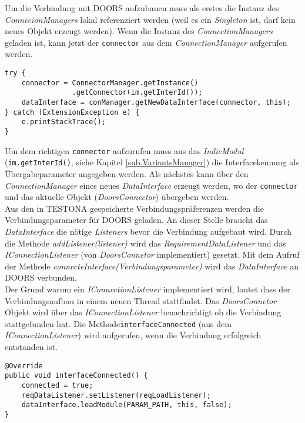 Um die Verbindung mit DOORS aufzubauen muss als erstes die Instanz des \textit{ConnecionManagers} lokal referenziert werden (weil es ein \textit{Singleton} ist, darf kein neues Objekt erzeugt werden). Wenn die Instanz des \textit{ConnectionManagers} geladen ist, kann jetzt der \texttt{connector} aus dem \textit{ConnectionManager} aufgerufen werden.

\begin{lstlisting}[caption={Verbindungsaufbau}, captionpos=b]
try {
	connector = ConnectorManager.getInstance()
				.getConnector(im.getInterId());
	dataInterface = conManager.getNewDataInterface(connector, this);
} catch (ExtensionException e) {
	e.printStackTrace();
}
\end{lstlisting}

 Um dem richtigen \texttt{connector} aufzurufen muss aus das \textit{IndieModul} (\texttt{im.getInterId()}, siehe Kapitel \ref{sub.VariantsManager}) die Interfacekennung als Übergabeparameter angegeben werden. Als nächstes kann über den \textit{ConnectionManager} eines neues \textit{DataInterface} erzeugt werden, wo der \texttt{connector} und das aktuelle Objekt (\textit{DoorsConnector}) übergeben werden.\\
 
Aus den in TESTONA gespeicherte Verbindungspräferenzen werden die Verbindungsparameter für DOORS geladen. An dieser Stelle braucht das \textit{DataInterface} die nötige \textit{Listeners} bevor die Verbindung aufgebaut wird. Durch die Methode \textit{addListener(listener)} wird das \textit{RequirementDataListener} und das \textit{IConnectionListener} (von \textit{DoorsConnetor} implementiert) gesetzt. Mit dem Aufruf der Methode \textit{connecteInterface(Verbindungsparameter)} wird das \textit{DataInterface} an DOORS verbunden.\\

Der Grund warum ein \textit{IConnectionListener} implementiert wird, lautet dass der Verbindungsaufbau in einem neuen Thread stattfindet. Das \textit{DoorsConnetor} Objekt wird über das \textit{IConnectionListener} benachrichtigt ob die Verbindung stattgefunden hat. Die Methode\texttt{interfaceConnected} (aus dem \textit{IConnectionListener}) wird aufgerufen, wenn die Verbindung erfolgreich entstanden ist.

\begin{lstlisting}[caption={Verbindungsaufbau war erfolgreich}, captionpos=b]
@Override
public void interfaceConnected() {
	connected = true;
	reqDataListener.setListener(reqLoadListener);
	dataInterface.loadModule(PARAM_PATH, this, false);
}
\end{lstlisting}

